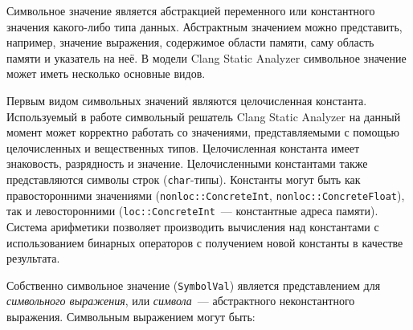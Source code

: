 Символьное значение является абстракцией переменного или константного значения какого-либо типа данных. Абстрактным значением можно представить, например, значение выражения, содержимое области памяти, саму область памяти и указатель на неё. В модели Clang Static Analyzer символьное значение может иметь несколько основные видов.

Первым видом символьных значений являются целочисленная константа. Используемый в работе символьный решатель Clang Static Analyzer на данный момент может корректно работать со значениями, представляемыми с помощью целочисленных и вещественных типов. Целочисленная константа имеет знаковость, разрядность и значение. Целочисленными константами также представляются символы строк (\texttt{char}-типы). Константы могут быть как правосторонними значениями (\texttt{nonloc::ConcreteInt}, \texttt{nonloc::ConcreteFloat}), так и левосторонними (\texttt{loc::ConcreteInt}~--- константные адреса памяти). Система арифметики позволяет производить вычисления над константами с использованием бинарных операторов с получением новой константы в качестве результата.

Собственно символьное значение (\texttt{SymbolVal}) является представлением для \textit{символьного выражения}, или \textit{символа}~--- абстрактного неконстантного выражения. Символьным выражением могут быть:

